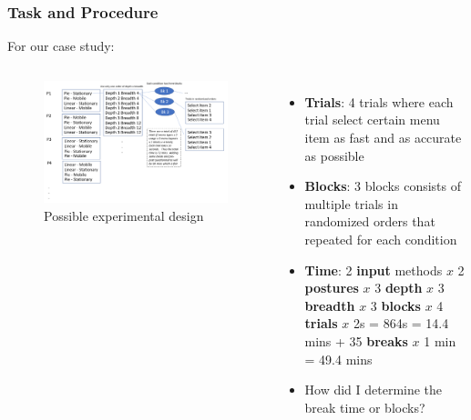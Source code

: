 \documentclass{beamer}
\begin{document}
\begin{frame}
\frametitle{Task and Procedure}
For our case study:
\begin{columns}[c] %
	
	\begin{figure}
		\includegraphics[width=1\linewidth]{design}
		\caption{Possible experimental design}
	\end{figure}
	
	\vspace{-20pt}
	\footnotesize
	\begin{itemize}
		\item \textbf{Trials}: 4 trials where each trial select certain menu item as fast and as accurate as possible
		\item \textbf{Blocks}: 3 blocks consists of multiple trials in randomized orders that repeated for each condition 
		\item \textbf{Time}: 2 \textbf{input} methods $x$ 2 \textbf{postures} $x$ 3 \textbf{depth} $x$ 3 \textbf{breadth} $x$ 3 \textbf{blocks} $x$ 4 \textbf{trials} $x$ 2s = 864s = 14.4 mins + 35 \textbf{breaks} $x$ 1 min  = 49.4 mins
		\item How did I determine the break time or blocks?
	\end{itemize}
\end{columns}

\end{frame}
\end{document}
